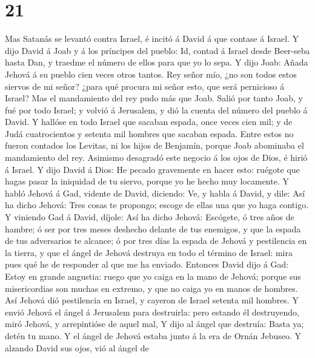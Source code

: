 \hypertarget{section-20}{%
\section{21}\label{section-20}}

 Mas Satanás se levantó contra Israel, é incitó á David á
que contase á Israel.  Y dijo David á Joab y á los
príncipes del pueblo: Id, contad á Israel desde Beer-seba hasta Dan, y
traedme el número de ellos para que yo lo sepa.  Y dijo
Joab: Añada Jehová á su pueblo cien veces otros tantos. Rey señor mío,
¿no son todos estos siervos de mi señor? ¿para qué procura mi señor
esto, que será pernicioso á Israel?  Mas el mandamiento
del rey pudo más que Joab. Salió por tanto Joab, y fué por todo Israel;
y volvió á Jerusalem, y dió la cuenta del número del pueblo á David.
 Y hallóse en todo Israel que sacaban espada, once veces
cien mil; y de Judá cuatrocientos y setenta mil hombres que sacaban
espada.  Entre estos no fueron contados los Levitas, ni
los hijos de Benjamín, porque Joab abominaba el mandamiento del rey.
 Asimismo desagradó este negocio á los ojos de Dios, é
hirió á Israel.  Y dijo David á Dios: He pecado gravemente
en hacer esto: ruégote que hagas pasar la iniquidad de tu siervo, porque
yo he hecho muy locamente.  Y habló Jehová á Gad, vidente
de David, diciendo:  Ve, y habla á David, y dile: Así ha
dicho Jehová: Tres cosas te propongo; escoge de ellas una que yo haga
contigo.  Y viniendo Gad á David, díjole: Así ha dicho
Jehová:  Escógete, ó tres años de hambre; ó ser por tres
meses deshecho delante de tus enemigos, y que la espada de tus
adversarios te alcance; ó por tres días la espada de Jehová y
pestilencia en la tierra, y que el ángel de Jehová destruya en todo el
término de Israel: mira pues qué he de responder al que me ha enviado.
 Entonces David dijo á Gad: Estoy en grande angustia:
ruego que yo caiga en la mano de Jehová; porque sus misericordias son
muchas en extremo, y que no caiga yo en manos de hombres.
 Así Jehová dió pestilencia en Israel, y cayeron de
Israel setenta mil hombres.  Y envió Jehová el ángel á
Jerusalem para destruirla: pero estando él destruyendo, miró Jehová, y
arrepintióse de aquel mal,  Y dijo al ángel que destruía:
Basta ya; detén tu mano. Y el ángel de Jehová estaba junto á la era de
Ornán Jebuseo.  Y alzando David sus ojos, vió al ángel de
